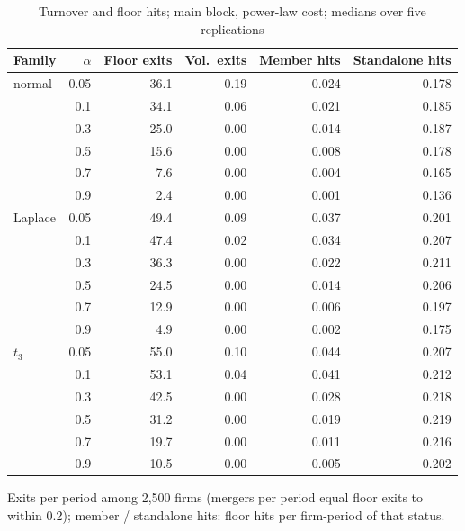 \begin{table}[htbp]
\centering
\caption{Turnover and floor hits; main block, power-law cost; medians over five replications}
\label{tab:turnover}
\small
\begin{tabular}{lrrrrr}
\toprule
Family & $\alpha$ & Floor exits & Vol.\ exits & Member hits & Standalone hits \\
\midrule
normal & 0.05 & 36.1 & 0.19 & 0.024 & 0.178 \\
 & 0.1 & 34.1 & 0.06 & 0.021 & 0.185 \\
 & 0.3 & 25.0 & 0.00 & 0.014 & 0.187 \\
 & 0.5 & 15.6 & 0.00 & 0.008 & 0.178 \\
 & 0.7 & 7.6 & 0.00 & 0.004 & 0.165 \\
 & 0.9 & 2.4 & 0.00 & 0.001 & 0.136 \\
\midrule
Laplace & 0.05 & 49.4 & 0.09 & 0.037 & 0.201 \\
 & 0.1 & 47.4 & 0.02 & 0.034 & 0.207 \\
 & 0.3 & 36.3 & 0.00 & 0.022 & 0.211 \\
 & 0.5 & 24.5 & 0.00 & 0.014 & 0.206 \\
 & 0.7 & 12.9 & 0.00 & 0.006 & 0.197 \\
 & 0.9 & 4.9 & 0.00 & 0.002 & 0.175 \\
\midrule
$t_3$ & 0.05 & 55.0 & 0.10 & 0.044 & 0.207 \\
 & 0.1 & 53.1 & 0.04 & 0.041 & 0.212 \\
 & 0.3 & 42.5 & 0.00 & 0.028 & 0.218 \\
 & 0.5 & 31.2 & 0.00 & 0.019 & 0.219 \\
 & 0.7 & 19.7 & 0.00 & 0.011 & 0.216 \\
 & 0.9 & 10.5 & 0.00 & 0.005 & 0.202 \\
\bottomrule
\end{tabular}
\par\smallskip\begin{minipage}{0.95\linewidth}\footnotesize Exits per period among 2,500 firms (mergers per period equal floor exits to within 0.2); member / standalone hits: floor hits per firm-period of that status.\end{minipage}
\end{table}
